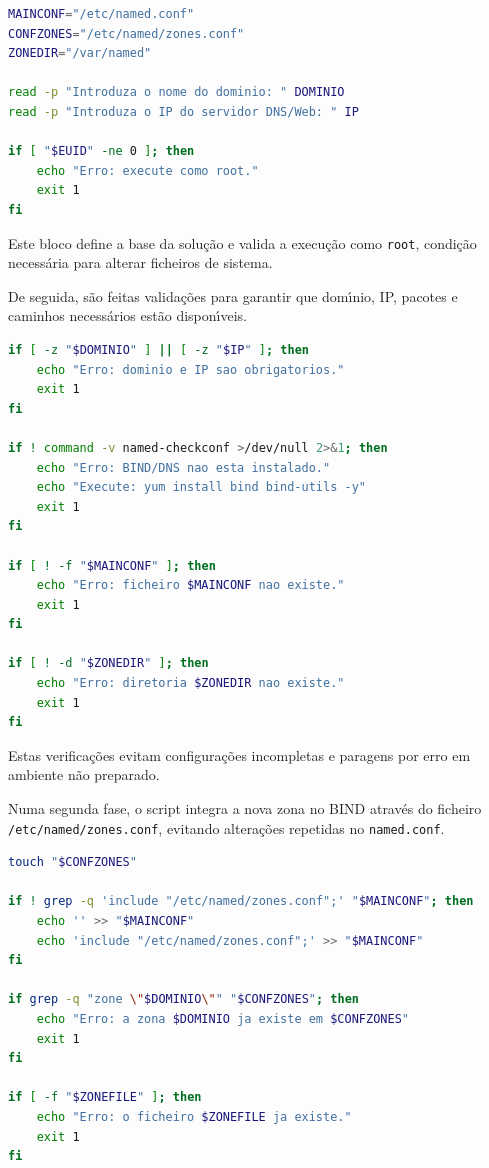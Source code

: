\begin{lstlisting}[language=bash,caption={Definicoes base e validacoes iniciais}]
MAINCONF="/etc/named.conf"
CONFZONES="/etc/named/zones.conf"
ZONEDIR="/var/named"

read -p "Introduza o nome do dominio: " DOMINIO
read -p "Introduza o IP do servidor DNS/Web: " IP

if [ "$EUID" -ne 0 ]; then
    echo "Erro: execute como root."
    exit 1
fi
\end{lstlisting}

Este bloco define a base da solu\c{c}\~ao e valida a execu\c{c}\~ao como \texttt{root}, condi\c{c}\~ao necess\'aria para alterar ficheiros de sistema.

De seguida, s\~ao feitas valida\c{c}\~oes para garantir que dom\'{\i}nio, IP, pacotes e caminhos necess\'arios est\~ao dispon\'{\i}veis.

\begin{lstlisting}[language=bash,caption={Validacao de pre-condicoes de execucao}]
if [ -z "$DOMINIO" ] || [ -z "$IP" ]; then
    echo "Erro: dominio e IP sao obrigatorios."
    exit 1
fi

if ! command -v named-checkconf >/dev/null 2>&1; then
    echo "Erro: BIND/DNS nao esta instalado."
    echo "Execute: yum install bind bind-utils -y"
    exit 1
fi

if [ ! -f "$MAINCONF" ]; then
    echo "Erro: ficheiro $MAINCONF nao existe."
    exit 1
fi

if [ ! -d "$ZONEDIR" ]; then
    echo "Erro: diretoria $ZONEDIR nao existe."
    exit 1
fi
\end{lstlisting}

Estas verifica\c{c}\~oes evitam configura\c{c}\~oes incompletas e paragens por erro em ambiente n\~ao preparado.

Numa segunda fase, o script integra a nova zona no BIND atrav\'es do ficheiro \texttt{/etc/named/zones.conf}, evitando altera\c{c}\~oes repetidas no \texttt{named.conf}.

\begin{lstlisting}[language=bash,caption={Integracao da zona e prevencao de duplicados}]
touch "$CONFZONES"

if ! grep -q 'include "/etc/named/zones.conf";' "$MAINCONF"; then
    echo '' >> "$MAINCONF"
    echo 'include "/etc/named/zones.conf";' >> "$MAINCONF"
fi

if grep -q "zone \"$DOMINIO\"" "$CONFZONES"; then
    echo "Erro: a zona $DOMINIO ja existe em $CONFZONES"
    exit 1
fi

if [ -f "$ZONEFILE" ]; then
    echo "Erro: o ficheiro $ZONEFILE ja existe."
    exit 1
fi
\end{lstlisting}

